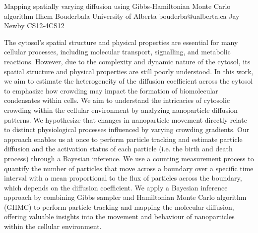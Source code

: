 \begin{talk}
{Mapping spatially varying diffusion using Gibbs-Hamiltonian Monte Carlo algorithm}
{Ilhem Bouderbala}
{University of Alberta}
{bouderba@ualberta.ca}
{Jay Newby}
{}{}{CS12-4}{CS12}




The cytosol's spatial structure and physical properties are essential for many cellular processes, including molecular transport, signalling, and metabolic reactions. However, due to the complexity and dynamic nature of the cytosol, its spatial structure and physical properties are still poorly understood. In this work, we aim to estimate the heterogeneity of the diffusion coefficient across the cytosol to emphasize how crowding may impact the formation of biomolecular condensates within cells. We aim to understand the intricacies of cytosolic crowding within the cellular environment by analyzing nanoparticle diffusion patterns. We hypothesize that changes in nanoparticle movement directly relate to distinct physiological processes influenced by varying crowding gradients. Our approach enables us at once to perform particle tracking and estimate particle diffusion and the activation status of each particle (i.e. the birth and death process) through a Bayesian inference. We use a counting measurement process to quantify the number of particles that move across a boundary over a specific time interval with a mean proportional to the flux of particles across the boundary, which depends on the diffusion coefficient. We apply a Bayesian inference approach by combining Gibbs sampler and Hamiltonian Monte Carlo algorithm (GHMC) to perform particle tracking and mapping the molecular diffusion, offering valuable insights into the movement and behaviour of nanoparticles within the cellular environment.
\end{talk}

